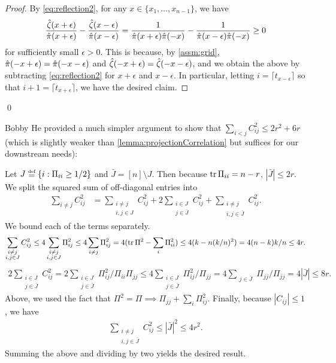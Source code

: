 \documentclass[main.tex]{subfiles}
\begin{document}
\begin{proof}
By \cref{eq:reflection2}, for any $x\in\{x_{1},\ldots,x_{n-1}\}$, we have
\[
\frac{\hat{\zeta}(x+\epsilon)}{\hat{\pi}(x+\epsilon)}-\frac{\hat{\zeta}(x-\epsilon)}{\hat{\pi}(x-\epsilon)}=\frac{1}{\hat{\pi}(x+\epsilon)\hat{\pi}(-x)}-\frac{1}{\hat{\pi}(x-\epsilon)\hat{\pi}(-x)}\ge0
\]
for sufficiently small $\epsilon>0$. This is because, by \cref{assm:grid}, $\hat{\pi}(-x+\epsilon)=\hat{\pi}(-x-\epsilon)$ and $\hat{\zeta}(-x+\epsilon)=\hat{\zeta}(-x-\epsilon)$, and we obtain the above by subtracting \cref{eq:reflection2} for $x+\epsilon$ and $x-\epsilon$. In particular, letting $i=\lceil t_{x-\epsilon}\rceil$ so that $i+1=\lceil t_{x+\epsilon}\rceil$, we have the desired claim.
\end{proof}

\qed

\begin{rem}\label{lemma:projectionCorrelation}
Bobby He provided a much simpler argument to show that $\sum_{i < j} C_{ij}^2 \le 2 r^2 + 6r$ (which is slightly weaker than \cref{lemma:projectionCorrelation} but suffices for our downstream needs):

Let $J \defeq \{i: \Pi_{ii} \ge 1/2\}$ and $\bar J = [n] \setminus J$.
Then because $\operatorname{tr} \Pi_{ii} = n - r$, $|\bar J| \le 2 r$.
We split the squared sum of off-diagonal entries into
\begin{align*}
  \sum_{i\ne j} C_{ij}^2
  &=
    \sum_{\substack{i\ne j\\ i,j \in J}} C_{ij}^2
    + 2\sum_{\substack{i \in J \\ j \in \bar J}} C_{ij}^2
    + \sum_{\substack{i\ne j\\ i, j \in \bar J}} C_{ij}^2
    .
\end{align*}
We bound each of the terms separately.
\begin{align*}
  \sum_{\substack{i\ne j\\ i,j \in J}} C_{ij}^2
  \le 4 \sum_{\substack{i\ne j\\ i,j \in J}} \Pi_{ij}^2
  \le 4 \sum_{\substack{i\ne j}} \Pi_{ij}^2
  = 4 (\operatorname{tr} \Pi ^ 2 - \sum_{i} \Pi_{ii}^2)
  \le 4 (k - n (k/n)^2)
  = 4(n - k)k/n \le 4r.
\end{align*}
\begin{align*}
  2\sum_{\substack{i \in J \\ j \in \bar J}} C_{ij}^2
  = 2\sum_{\substack{i \in J \\ j \in \bar J}} \Pi_{ij}^2/\Pi_{ii} \Pi_{jj}
  \le 4\sum_{\substack{i \in J \\ j \in \bar J}} \Pi_{ij}^2/  \Pi_{jj}
  = 4\sum_{\substack{j \in \bar J}} \Pi_{jj}/  \Pi_{jj}
  = 4 |\bar J|
  \le 8 r.
\end{align*}
Above, we used the fact that $\Pi^2 = \Pi \implies \Pi_{jj} + \sum_{i} \Pi_{ij}^2$.
Finally, because $|C_{ij}| \le 1$, we have
\begin{align*}
  \sum_{\substack{i\ne j\\ i, j \in \bar J}} C_{ij}^2
  \le |\bar J|^2 \le 4r^2.
\end{align*}
Summing the above and dividing by two yields the desired result.
\end{rem}
\end{document}
